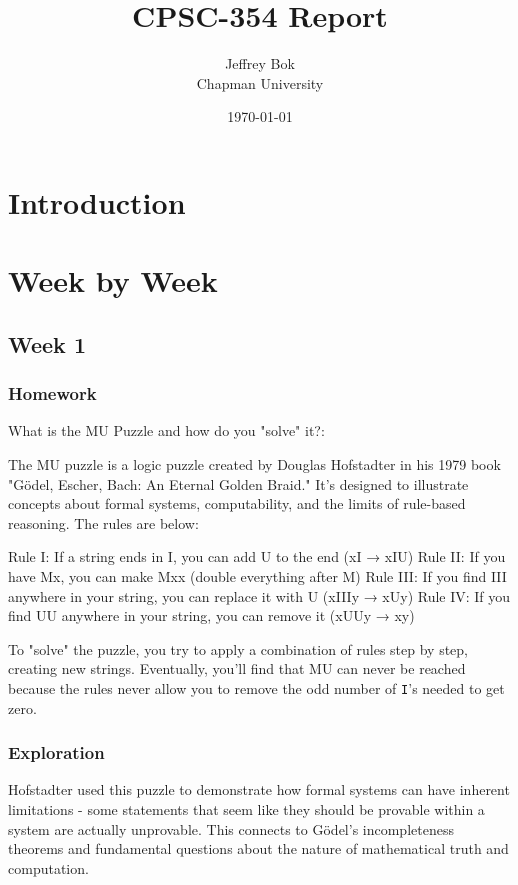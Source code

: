 \documentclass{article}
\title{CPSC-354 Report}
\author{Jeffrey Bok  \\ Chapman University}
\date{\today}
\theoremstyle{theorem}
\theoremstyle{definition}
\theoremstyle{remark}
\begin{document}
\maketitle

\begin{abstract}

\end{abstract}

\setcounter{tocdepth}{3}
\tableofcontents

\section{Introduction}\label{intro}

\section{Week by Week}\label{homework}

\subsection{Week 1}
\subsubsection{Homework}

What is the MU Puzzle and how do you "solve" it?:

The MU puzzle is a logic puzzle created by Douglas Hofstadter in his 1979 book "Gödel, Escher, Bach: An Eternal Golden Braid." It's designed to illustrate concepts about formal systems, computability, and the limits of rule-based reasoning. The rules are below:

Rule I: If a string ends in I, you can add U to the end (xI → xIU)\newline
Rule II: If you have Mx, you can make Mxx (double everything after M)\newline
Rule III: If you find III anywhere in your string, you can replace it with U (xIIIy → xUy)\newline
Rule IV: If you find UU anywhere in your string, you can remove it (xUUy → xy)

To "solve" the puzzle, you try to apply a combination of rules step by step, creating new strings. 
Eventually, you'll find that MU can never be reached because the rules never allow you to remove the odd number of \texttt{I}'s needed to get zero. 

\subsubsection{Exploration}
Hofstadter used this puzzle to demonstrate how formal systems can have inherent limitations - some statements that seem like they should be provable within a system are actually unprovable. This connects to Gödel's incompleteness theorems and fundamental questions about the nature of mathematical truth and computation.
\end{document}
